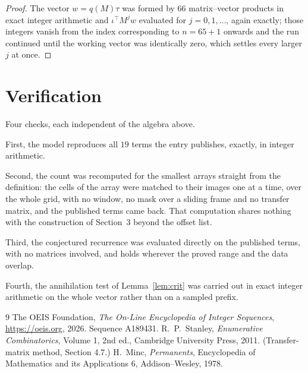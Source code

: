 \documentclass[11pt,a4paper]{article}
\theoremstyle{plain}
\theoremstyle{definition}
\begin{document}
\begin{proof}
The vector $w=q(M)\tau$ was formed by $66$ matrix--vector products in exact integer
arithmetic and $\iota^{\!\top}M^{j}w$ evaluated for $j=0,1,\dots$, again exactly; those
integers vanish from the index corresponding to $n=65+1$ onwards and the run continued
until the working vector was identically zero, which settles every larger $j$ at once.
\end{proof}

\section{Verification}

Four checks, each independent of the algebra above.

First, the model reproduces all $19$ terms the entry publishes, exactly, in integer
arithmetic.

Second, the count was recomputed for the smallest arrays straight from the definition: the
cells of the array were matched to their images one at a time, over the whole grid, with no
window, no mask over a sliding frame and no transfer matrix, and the published terms came back.
That computation shares nothing with the construction of Section~3 beyond the offset list.

Third, the conjectured recurrence was evaluated directly on the published terms, with no
matrices involved, and holds wherever the proved range and the data overlap.

Fourth, the annihilation test of Lemma~\ref{lem:crit} was carried out in exact integer
arithmetic on the whole vector rather than on a sampled prefix.

\begin{thebibliography}{9}
 The OEIS Foundation, \emph{The On-Line Encyclopedia of Integer
Sequences}, \url{https://oeis.org}, 2026. Sequence A189431.
 R.~P.~Stanley, \emph{Enumerative Combinatorics}, Volume 1, 2nd ed.,
Cambridge University Press, 2011. (Transfer-matrix method, Section 4.7.)
 H.~Minc, \emph{Permanents}, Encyclopedia of Mathematics and its
Applications 6, Addison--Wesley, 1978.
\end{thebibliography}
\end{document}
